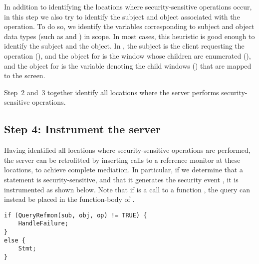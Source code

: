 In addition to identifying the locations where security-sensitive operations
occur, in this step we also try to identify the subject and object associated
with the operation. To do so, we identify the variables corresponding to
subject and object data types (such as  and ) in
scope. In most cases, this heuristic is good enough to identify the subject and
the object. In , the subject is the client
requesting the operation (), and the object for
 is the window whose children are enumerated
(), and the object for  is the variable denoting
the child windows () that are mapped to the screen.

Step~2 and~3 together identify all locations where the server performs
security-sensitive operations.  



\subsection{Step 4: Instrument the server} 
\label{chapter:overview:approach:step4}
%
Having identified all locations where security-sensitive operations are
performed, the server can be retrofitted by inserting calls to a reference
monitor at these locations, to achieve complete mediation. In particular, if we
determine that a statement  is security-sensitive, and that
it generates the security event
, it is instrumented as shown
below.  Note that if  is a call to a function ,
the query can instead be placed in the function-body of .

\begin{center}
\newsavebox{\queryreferencemonitor}
\begin{lrbox}{\queryreferencemonitor}
\begin{minipage}[ht]{3.45in}
\begin{lstlisting}
if (QueryRefmon(sub, obj, op) != TRUE) {
    HandleFailure;
} 
else {
    Stmt;
}
\end{lstlisting}
\end{minipage}
\end{lrbox}\fbox{\usebox{\queryreferencemonitor}}
\end{center}

